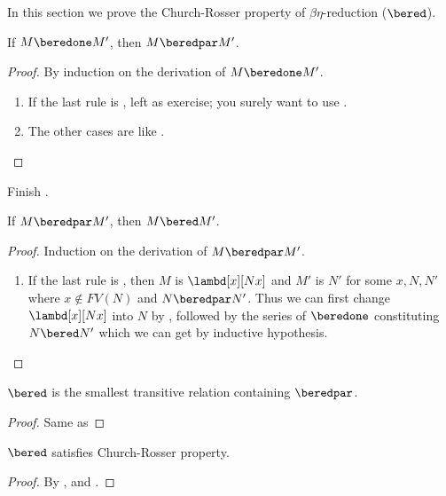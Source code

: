 \documentclass[../../../include/open-logic-section]{subfiles}
\begin{document}


In this section we prove the Church-Rosser property of
$\beta\eta$-reduction ($\bered$).

\begin{lem}
  If $M \beredone M'$, then $M \beredpar M'$.
\end{lem}
\begin{proof} By induction on the derivation of $M \beredone M'$.
  \begin{enumerate}
  \item If the last rule is , left as
    exercise; you surely want to use . 
  \item The other cases are like .
  \end{enumerate}
\end{proof}

\begin{prob}
  Finish .
\end{prob}

\begin{lem}
  If $M \beredpar M'$, then $M \bered M'$.
\end{lem}
\begin{proof} Induction on the derivation of $M \beredpar M'$.
  \begin{enumerate}
    \item If the last rule is , then $M$ is
      $\lambd[x][Nx]$ and $M'$ is $N'$ for some $x, N, N'$ where $x
      \notin FV(N)$ and $N \beredpar N'$. Thus we can first change
      $\lambd[x][Nx]$ into $N$ by , followed by
      the series of $\beredone$ constituting $N \bered N'$ which we
      can get by inductive hypothesis.
  \end{enumerate}
\end{proof}


\begin{lem}
  $\bered$ is the smallest transitive relation containing $\beredpar$.
\end{lem}
\begin{proof}
  Same as 
\end{proof}

\begin{thm}
  $\bered$ satisfies Church-Rosser property.
\end{thm}
\begin{proof}
  By ,  and .
\end{proof}
\end{document}
